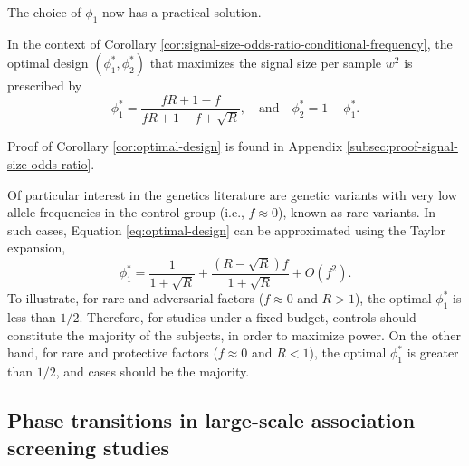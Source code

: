 The choice of $\phi_1$ now has a practical solution.

\begin{corollary} \label{cor:optimal-design}
In the context of Corollary \ref{cor:signal-size-odds-ratio-conditional-frequency},
the optimal design $(\phi^*_1, \phi^*_2)$ that maximizes the signal size per sample $w^2$ is prescribed by
\begin{equation} \label{eq:optimal-design}
    \phi_1^* = \frac{fR+1-f}{fR+1-f+\sqrt{R}}, \quad\text{and}\quad 
    \phi_2^* = 1-\phi_1^*.
\end{equation}
\end{corollary} 

Proof of Corollary \ref{cor:optimal-design} is found in Appendix \ref{subsec:proof-signal-size-odds-ratio}. 

Of particular interest in the genetics literature are genetic variants with very low allele frequencies in the control group (i.e., $f\approx 0$), known as rare variants.
In such cases, Equation \eqref{eq:optimal-design} can be approximated using the Taylor expansion,
\begin{equation} \label{eq:optimal-design-approx}
    \phi_1^* = \frac{1}{1 + \sqrt{R}} + \frac{(R-\sqrt{R})f}{1+\sqrt{R}} + O(f^2).
\end{equation}
To illustrate, for rare and adversarial factors ($f\approx0$ and $R>1$), the optimal $\phi_1^*$ is less than $1/2$.
Therefore, for studies under a fixed budget, controls should constitute the majority of the subjects, in order to maximize power.
On the other hand, for rare and protective factors ($f\approx0$ and $R<1$), the optimal $\phi_1^*$ is greater than $1/2$, and cases should be the majority.

\subsection{Phase transitions in large-scale association screening studies}



